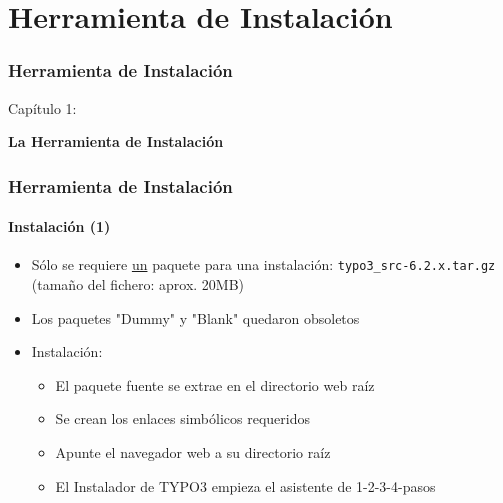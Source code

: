 %

\section{Herramienta de Instalación}
\begin{frame}[fragile]
	\frametitle{Herramienta de Instalación}

	\begin{center}\huge{Capítulo 1:}\end{center}
	\begin{center}\huge{\color{typo3darkgrey}\textbf{La Herramienta de Instalación}}\end{center}

\end{frame}


\begin{frame}[fragile]
	\frametitle{Herramienta de Instalación}
	\framesubtitle{Instalación (1)}

	\begin{itemize}
		\item Sólo se requiere \underline{un} paquete para una instalación:\newline
				\texttt{typo3\_src-6.2.x.tar.gz} (tamaño del fichero: aprox. 20MB)
		\item Los paquetes "Dummy" y "Blank" quedaron obsoletos
		\item Instalación:
			\begin{itemize}
				\item El paquete fuente se extrae en el directorio web raíz
				\item Se crean los enlaces simbólicos requeridos
				\item Apunte el navegador web a su directorio raíz
				\item El Instalador de TYPO3 empieza el asistente de 1-2-3-4-pasos
			\end{itemize}

	\end{itemize}

\end{frame}

